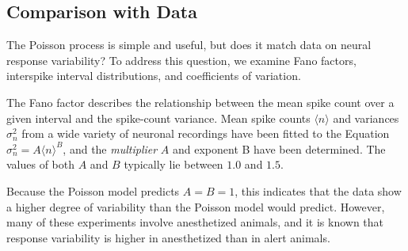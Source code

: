 \subsection{Comparison with Data}
\begin{rem}
    The Poisson process is simple and useful, but does it match data on neural response variability? To address this question,  we examine Fano factors, interspike interval distributions,  and coefficients of variation.
\end{rem}

\begin{prop}
    The Fano factor describes the relationship between the mean spike count over a given interval and the spike-count variance. Mean spike counts $\langle n \rangle $ and variances $\sigma^2_n$ from a wide variety of neuronal recordings have been fitted to the Equation $\sigma^2_n = A\langle n\rangle^B $, and the \emph{multiplier} $A$ and exponent B have been determined. The values of both $A$ and $B$ typically lie between 
    $1.0$ and $1.5.$
\end{prop}

\begin{rem}
    Because the Poisson model predicts $A = B = 1$, this indicates
that the data show a higher degree of variability than the Poisson model
would predict. However, many of these experiments involve anesthetized
animals, and it is known that response variability is higher in anesthetized
than in alert animals.
\end{rem}


